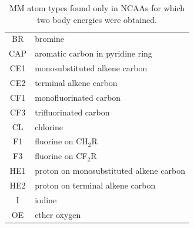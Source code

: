 \begin{table}[!htbp]
\begin{tabular}{c|l}
\hline
BR & bromine\\
CAP & aromatic carbon in pyridine ring\\
CE1 & monosubstituted alkene carbon\\
CE2 & terminal alkene carbon\\
CF1 & monofluorinated carbon\\
CF3 & trifluorinated carbon\\
CL & chlorine\\
F1 & fluorine on CH$_2$R\\
F3 & fluorine on CF$_2$R\\
HE1 & proton on monosubstituted alkene carbon \\
HE2 & proton on terminal alkene carbon\\
I & iodine\\
OE & ether oxygen\\
\end{tabular}

\fontsize{10pt}{11pt}
\selectfont
\caption{MM atom types found only in NCAAs for which two body energies were obtained.}
\label{tab:atypes_all}

\end{table}



